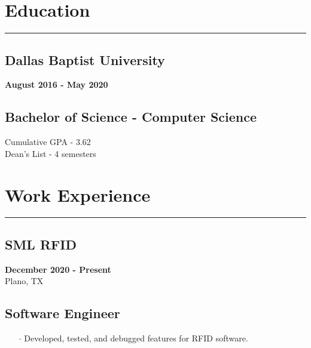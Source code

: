 \documentclass[10pt]{article}
\begin{document}
\section*{Education}
\vspace{-.6cm}
\par\noindent\textcolor{black}{\rule{\textwidth}{.5pt}} 
\vspace{-.8cm}
\begin{paracol}{2}
    \begin{leftcolumn} 
        \sloppy
        \subsection*{Dallas Baptist University}
        \textbf{August 2016 -  May 2020}
    \end{leftcolumn}

    \begin{rightcolumn} 
        \subsection*{Bachelor of Science - Computer Science}
        Cumulative GPA - 3.62 \\
        Dean's List - 4 semesters
    \end{rightcolumn}
\end{paracol}

\section*{Work Experience}
\vspace{-.6cm}
\par\noindent\textcolor{black}{\rule{\textwidth}{.5pt}} 
\vspace{-.8cm}

\begin{paracol}{2}
    \begin{leftcolumn} 
        \sloppy
        \subsection*{SML RFID}
        \textbf{December 2020 -  Present} \\
        Plano, TX
    \end{leftcolumn}

    \begin{rightcolumn} 
        \subsection*{Software Engineer}
        \begin{itemize}[leftmargin=.28cm, itemsep=1pt]
            \item[$\cdot$] Developed, tested, and debugged features for RFID software.
        \end{itemize}
    \end{rightcolumn}
\end{paracol}
\vspace{-.2cm}
\end{document}
